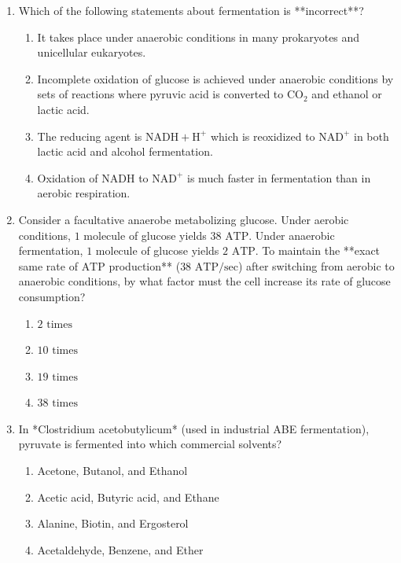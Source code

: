 \documentclass[11pt, a4paper]{article}
\begin{document}
\begin{enumerate}[label=\textbf{\arabic*.}]
\item Which of the following statements about fermentation is **incorrect**?
\begin{enumerate}[label=(\Alph*)]
    \item It takes place under anaerobic conditions in many prokaryotes and unicellular eukaryotes.
    \item Incomplete oxidation of glucose is achieved under anaerobic conditions by sets of reactions where pyruvic acid is converted to $\text{CO}_2$ and ethanol or lactic acid.
    \item The reducing agent is $\text{NADH} + \text{H}^+$ which is reoxidized to $\text{NAD}^+$ in both lactic acid and alcohol fermentation.
    \item Oxidation of $\text{NADH}$ to $\text{NAD}^+$ is much faster in fermentation than in aerobic respiration.
\end{enumerate}

\item Consider a facultative anaerobe metabolizing glucose. Under aerobic conditions, $1\text{ molecule}$ of glucose yields $38\text{ ATP}$. Under anaerobic fermentation, $1\text{ molecule}$ of glucose yields $2\text{ ATP}$. To maintain the **exact same rate of $\text{ATP}$ production** ($38\text{ ATP/sec}$) after switching from aerobic to anaerobic conditions, by what factor must the cell increase its rate of glucose consumption?
\begin{enumerate}[label=(\Alph*)]
    \item $2\text{ times}$
    \item $10\text{ times}$
    \item $19\text{ times}$
    \item $38\text{ times}$
\end{enumerate}

\item In *Clostridium acetobutylicum* (used in industrial ABE fermentation), pyruvate is fermented into which commercial solvents?
\begin{enumerate}[label=(\Alph*)]
    \item Acetone, Butanol, and Ethanol
    \item Acetic acid, Butyric acid, and Ethane
    \item Alanine, Biotin, and Ergosterol
    \item Acetaldehyde, Benzene, and Ether
\end{enumerate}

\end{enumerate}
\end{document}
